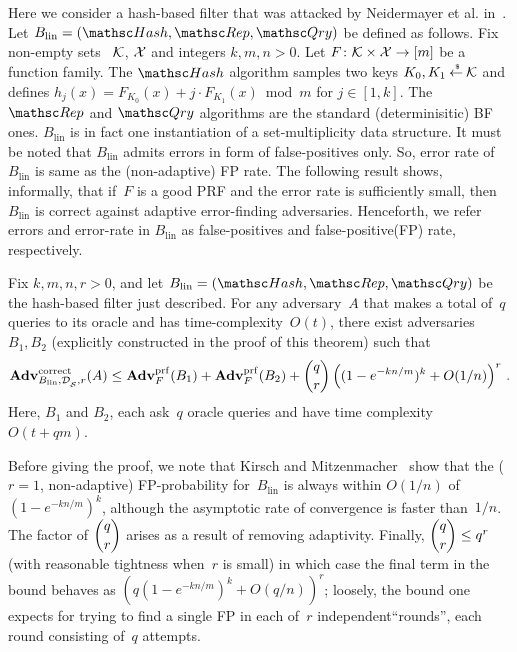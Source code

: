 Here we consider a hash-based filter that was attacked by Neidermayer et al. in~\cite{xxx}.  Let $B_{\mathrm{lin}}=(\Hash,\Rep,\Qry)$ be defined as follows.  Fix non-empty sets ~${\cal K}$, ${\cal X}$ and integers $k,m,n>0$.  Let $F\colon\mathcal{K} \times {\cal X} \to [m]$ be a function family.  The $\Hash$ algorithm samples two keys $K_0,K_1 {\:\stackrel{{\scriptscriptstyle \hspace{0.2em}\$}} {\leftarrow}\:} \mathcal{K}$ and defines $h_j(x) = F_{K_0}(x) + j\cdot F_{K_1}(x) \bmod m$ for $j \in [1,k]$.  The $\Rep$ and $\Qry$ algorithms are the standard (determinisitic) BF ones. $B_{\mathrm{lin}}$ is in fact one instantiation of a set-multiplicity data structure. It must be noted that $B_{\mathrm{lin}}$ admits errors in form of false-positives only. So, error rate of $B_{\mathrm{lin}}$ is same as the (non-adaptive) FP rate. The following result shows, informally, that if~$F$ is a good PRF and the error rate is sufficiently small, then $B_\mathrm{lin}$ is correct against adaptive error-finding adversaries. Henceforth, we refer errors and error-rate in $B_{\mathrm{lin}}$ as false-positives and false-positive(FP) rate, respectively.

\begin{theorem}\label{thm1}
Fix $k,m,n,r>0$, and let $B_\mathrm{lin}=(\Hash,\Rep,\Qry)$ be the hash-based filter just described. 
For any adversary~$A$ that makes a total of~$q$ queries to its oracle
and has time-complexity~$O(t)$,
there exist adversaries~$B_1,B_2$ (explicitly constructed in the proof of this theorem) such that
\[
\mathrm{\mathbf{Adv}}^{\mathrm{correct}}_{B_{\mathrm{lin}},\mathcal{D}_{{\cal S}}^{},r}(A) \leq  \mathbf{Adv}^{\mathrm{prf}}_{F}(B_1) + \mathbf{Adv}^{\mathrm{prf}}_{F}(B_2)  +{\dbinom{q}{r}} \left( (1-e^{-kn/m})^k + O(1/n) \right)^r\,.
\]
Here, $B_1$ and $B_2$, each ask~$q$ oracle queries and have time complexity~$O(t+qm)$.
\end{theorem}
Before giving the proof, we note that Kirsch and Mitzenmacher~\cite{xxx} show
that the ($r=1$, non-adaptive) FP-probability for~$B_\mathrm{lin}$ is
always within $O(1/n)$ of $(1-e^{-kn/m})^k$, although the asymptotic
rate of convergence is faster than~$1/n$.  The factor of $\dbinom{q}{r}$ arises as a result
of removing adaptivity.  Finally, $\dbinom{q}{r} \leq q^r$ (with
reasonable tightness when~$r$ is small) in which case the final term in the bound behaves as 
$(q (1-e^{-kn/m})^k + O(q/n) )^r$; loosely, the bound one expects for
trying to find a single FP in each of~$r$ independent``rounds'', each round
consisting of~$q$ attempts.


